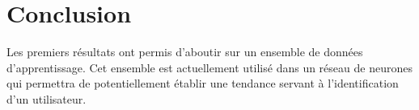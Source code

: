 \documentclass[conference,compsoc]{IEEEtran}
\begin{document}
\section{Conclusion}
Les premiers résultats ont permis d'aboutir sur un ensemble de données d'apprentissage. Cet ensemble est actuellement utilisé dans un réseau de neurones qui permettra de potentiellement établir une tendance servant à l'identification d'un utilisateur.







\end{document}
